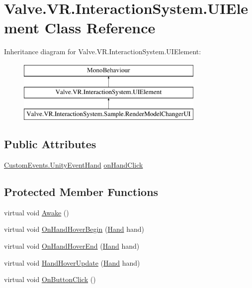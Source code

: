 \hypertarget{class_valve_1_1_v_r_1_1_interaction_system_1_1_u_i_element}{}\section{Valve.\+V\+R.\+Interaction\+System.\+U\+I\+Element Class Reference}
\label{class_valve_1_1_v_r_1_1_interaction_system_1_1_u_i_element}
Inheritance diagram for Valve.\+V\+R.\+Interaction\+System.\+U\+I\+Element\+:\begin{figure}[H]
\begin{center}
\leavevmode
\includegraphics[height=3.000000cm]{class_valve_1_1_v_r_1_1_interaction_system_1_1_u_i_element}
\end{center}
\end{figure}
\subsection*{Public Attributes}
\begin{DoxyCompactItemize}
\item 
\mbox{\hyperlink{class_valve_1_1_v_r_1_1_interaction_system_1_1_custom_events_1_1_unity_event_hand}{Custom\+Events.\+Unity\+Event\+Hand}} \mbox{\hyperlink{class_valve_1_1_v_r_1_1_interaction_system_1_1_u_i_element_a751b43bce40762d303a7c32da3f7e2a8}{on\+Hand\+Click}}
\end{DoxyCompactItemize}
\subsection*{Protected Member Functions}
\begin{DoxyCompactItemize}
\item 
virtual void \mbox{\hyperlink{class_valve_1_1_v_r_1_1_interaction_system_1_1_u_i_element_a85ab59351314bba761c53a89f249e246}{Awake}} ()
\item 
virtual void \mbox{\hyperlink{class_valve_1_1_v_r_1_1_interaction_system_1_1_u_i_element_aba8e58f6a13297d62df46b9c68e076ea}{On\+Hand\+Hover\+Begin}} (\mbox{\hyperlink{class_valve_1_1_v_r_1_1_interaction_system_1_1_hand}{Hand}} hand)
\item 
virtual void \mbox{\hyperlink{class_valve_1_1_v_r_1_1_interaction_system_1_1_u_i_element_abe630ac737c8f18be7710e4bd29b8269}{On\+Hand\+Hover\+End}} (\mbox{\hyperlink{class_valve_1_1_v_r_1_1_interaction_system_1_1_hand}{Hand}} hand)
\item 
virtual void \mbox{\hyperlink{class_valve_1_1_v_r_1_1_interaction_system_1_1_u_i_element_a025a3608cf51eb78b4db7db6f81b7bab}{Hand\+Hover\+Update}} (\mbox{\hyperlink{class_valve_1_1_v_r_1_1_interaction_system_1_1_hand}{Hand}} hand)
\item 
virtual void \mbox{\hyperlink{class_valve_1_1_v_r_1_1_interaction_system_1_1_u_i_element_af4aa0f9d62309d5299ed208c524da1d1}{On\+Button\+Click}} ()
\end{DoxyCompactItemize}
